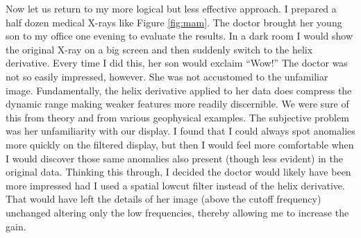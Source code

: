 



\par
Now let us return to my more logical but less effective approach.
I prepared a half dozen medical X-rays like Figure 
\ref{fig:mam}.
The doctor brought her young son to my office one evening
to evaluate the results.
In a dark room I would show the original X-ray on a big screen
and then suddenly switch to the helix derivative.
Every time I did this, her son would exclaim ``Wow!''
The doctor was not so easily impressed, however.
She was not accustomed to the unfamiliar image.
Fundamentally, the helix derivative applied to her data
does compress the dynamic range making weaker features more readily discernible.
We were sure of this from theory and from
various geophysical examples.
The subjective problem was her unfamiliarity with our display.
I found that I could always spot anomalies more quickly
on the filtered display, but then I would feel more comfortable
when I would discover those same anomalies also present
(though less evident) in the original data.
Thinking this through, I decided the doctor would likely have
been more impressed
had I used a spatial lowcut filter instead of the helix derivative.
That would have left the details of her image
(above the cutoff frequency)
unchanged
altering
only the low frequencies,
thereby allowing me to increase the gain.

